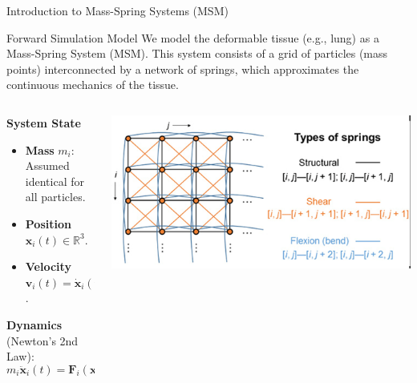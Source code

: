 \documentclass{beamer}
\begin{document}
\begin{frame}[fragile]{Introduction to Mass-Spring Systems (MSM)}
    \begin{block}{Forward Simulation Model}
    We model the deformable tissue (e.g., lung) as a Mass-Spring System (MSM). This system consists of a grid of particles (mass points) interconnected by a network of springs, which approximates the continuous mechanics of the tissue.
    \end{block}
    
    \begin{columns}
        \begin{column}{0.5\textwidth}
            \textbf{System State}
            \begin{itemize}
                \item \textbf{Mass} $m_i$: Assumed identical for all particles.
                \item \textbf{Position} $\mathbf{x}_i(t) \in \mathbb{R}^3$.
                \item \textbf{Velocity} $\mathbf{v}_i(t) = \dot{\mathbf{x}}_i(t)$.
            \end{itemize}
            \vspace{1em}
            \textbf{Dynamics} (Newton's 2nd Law):
            \begin{equation*}
                m_i \ddot{\mathbf{x}}_i(t) = \mathbf{F}_i(\mathbf{x}, \dot{\mathbf{x}})
            \end{equation*}
        \end{column}
        \begin{column}{0.5\textwidth}
            \includegraphics[width=\textwidth]{images/fig2.0.png}
        \end{column}
    \end{columns}
\end{frame}
\end{document}
